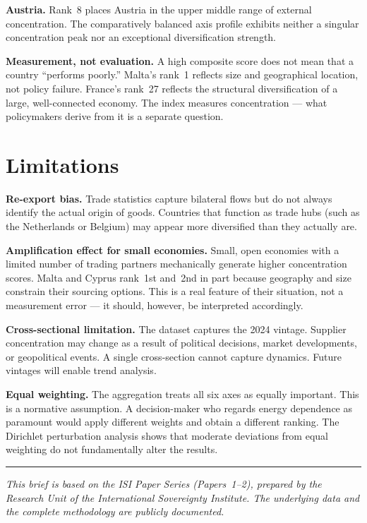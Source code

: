 \textbf{Austria.}
Rank~8 places Austria in the upper middle range of external
concentration.  The comparatively balanced axis profile exhibits
neither a singular concentration peak nor an exceptional
diversification strength.

\textbf{Measurement, not evaluation.}
A high composite score does not mean that a country ``performs
poorly.''  Malta's rank~1 reflects size and geographical location,
not policy failure.  France's rank~27 reflects the structural
diversification of a large, well-connected economy.  The index
measures concentration --- what policymakers derive from it is a
separate question.


\section{Limitations}
\label{sec:limitations}

\textbf{Re-export bias.}
Trade statistics capture bilateral flows but do not always identify
the actual origin of goods.  Countries that function as trade
hubs (such as the Netherlands or Belgium) may appear more
diversified than they actually are.

\textbf{Amplification effect for small economies.}
Small, open economies with a limited number of trading partners
mechanically generate higher concentration scores.  Malta and
Cyprus rank~1st and~2nd in part because geography and size
constrain their sourcing options.  This is a real feature of their
situation, not a measurement error --- it should, however, be
interpreted accordingly.

\textbf{Cross-sectional limitation.}
The dataset captures the 2024 vintage.  Supplier concentration may
change as a result of political decisions, market developments, or
geopolitical events.  A single cross-section cannot capture
dynamics.  Future \ISI vintages will enable trend analysis.

\textbf{Equal weighting.}
The aggregation treats all six axes as equally important.  This is
a normative assumption.  A decision-maker who regards energy
dependence as paramount would apply different weights and obtain a
different ranking.  The Dirichlet perturbation analysis shows that
moderate deviations from equal weighting do not fundamentally alter
the results.

\vfill
\begin{center}
\rule{0.4\linewidth}{0.4pt}
\end{center}
\smallskip
\noindent\textit{This brief is based on the ISI Paper Series
(Papers~1--2), prepared by the Research Unit of the International
Sovereignty Institute.  The underlying data and the complete
methodology are publicly documented.}
